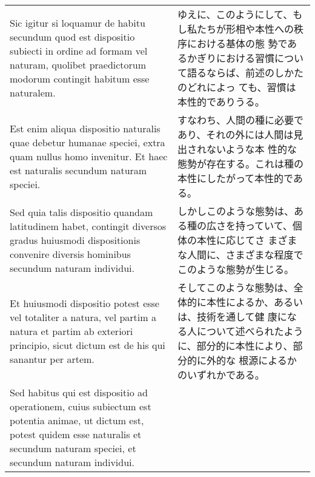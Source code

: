 \documentclass[10pt]{jsarticle} %
\begin{document}
\begin{longtable}{p{21em}p{21em}}
\\



Sic igitur si loquamur de habitu secundum quod est dispositio subiecti
in ordine ad formam vel naturam, quolibet praedictorum modorum
contingit habitum esse naturalem.


&

ゆえに、このようにして、もし私たちが形相や本性への秩序における基体の態
勢であるかぎりにおける習慣について語るならば、前述のしかたのどれによっ
ても、習慣は本性的でありうる。

\\



Est enim aliqua dispositio naturalis quae debetur humanae speciei,
extra quam nullus homo invenitur. Et haec est naturalis secundum
naturam speciei.



&

すなわち、人間の種に必要であり、それの外には人間は見出されないような本
性的な態勢が存在する。これは種の本性にしたがって本性的である。

\\



Sed quia talis dispositio quandam latitudinem habet, contingit
diversos gradus huiusmodi dispositionis convenire diversis hominibus
secundum naturam individui.


&

しかしこのような態勢は、ある種の広さを持っていて、個体の本性に応じてさ
まざまな人間に、さまざまな程度でこのような態勢が生じる。

\\



Et huiusmodi dispositio potest esse vel totaliter a natura, vel partim
a natura et partim ab exteriori principio, sicut dictum est de his qui
sanantur per artem.


&

そしてこのような態勢は、全体的に本性によるか、あるいは、技術を通して健
康になる人について述べられたように、部分的に本性により、部分的に外的な
根源によるかのいずれかである。

\\



Sed habitus qui est dispositio ad operationem, cuius subiectum est
potentia animae, ut dictum est, potest quidem esse naturalis et
secundum naturam speciei, et secundum naturam individui.



\end{longtable}
\end{document}
